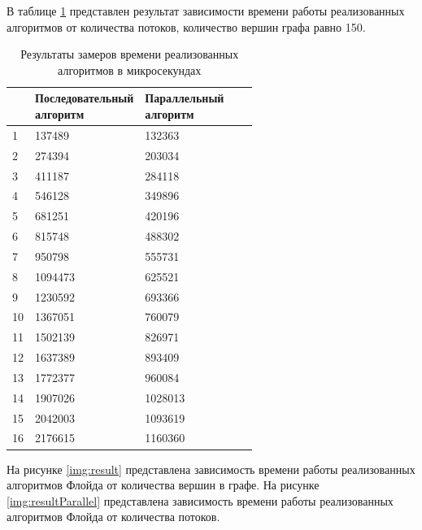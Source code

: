 В таблице \ref{tab:timeParallel} представлен результат зависимости времени работы реализованных алгоритмов от количества потоков, количество вершин графа равно 150.
\clearpage
\begin{table}[H]
	\begin{center}
		\begin{flushleft}
			\caption{\label{tab:timeParallel}Результаты замеров времени реализованных алгоритмов в микросекундах}
		\end{flushleft}
		\begin{tabular}{|l|l|l|l|l|}
			\hline \specialcell{Количество потоков} & \specialcell{Последовательный\\алгоритм} &
			\specialcell{Параллельный\\алгоритм}  \\\hline
			1  & 137489  & 132363 \\ \hline
			2  & 274394  & 203034 \\ \hline
			3  & 411187  & 284118 \\ \hline
			4  & 546128  & 349896 \\ \hline
			5  & 681251  & 420196 \\ \hline
			6  & 815748  & 488302 \\ \hline
			7  & 950798  & 555731 \\ \hline
			8  & 1094473 &  625521 \\ \hline
			9  & 1230592 &  693366 \\ \hline
			10 & 1367051 & 760079 \\ \hline
			11 & 1502139 & 826971 \\ \hline
			12 & 1637389 & 893409 \\ \hline
			13 & 1772377 & 960084 \\ \hline
			14 & 1907026 & 1028013 \\ \hline
			15 & 2042003 & 1093619  \\ \hline
			16 & 2176615 & 1160360  \\ \hline
		\end{tabular}
	\end{center}
\end{table}

На рисунке \ref{img:result} представлена зависимость времени работы реализованных алгоритмов Флойда от количества вершин в графе. На рисунке \ref{img:resultParallel} представлена зависимость времени работы реализованных алгоритмов Флойда от количества потоков.

